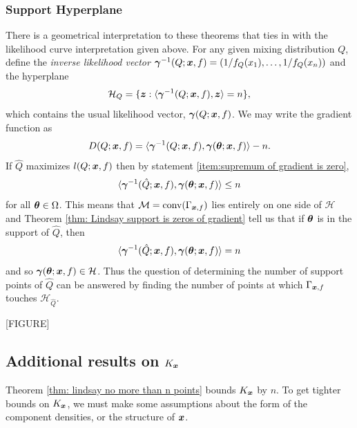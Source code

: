 	\subsubsection{Support Hyperplane}
	\label{sec: support hyperplane}
	There is a geometrical interpretation to these theorems that ties in with the likelihood curve interpretation given above. For any given mixing distribution $Q$, define the \emph{inverse likelihood vector} ${\bm{{\gamma}}}^{-1}(Q;{\bm{{x}}},f) = (1/f_Q(x_1),\dots, 1/f_Q(x_n))$ and the hyperplane
	\begin{equation}
		\mathcal{H}_{Q} = \{{\bm{{z}}} : \langle {\bm{{\gamma}}}^{-1}(Q;{\bm{{x}}},f), {\bm{{z}}}\rangle = n\},
	\end{equation}
	which contains the usual likelihood vector, ${\bm{{\gamma}}}(Q;{\bm{{x}}}, f)$. We may write the gradient function as
	\begin{equation}
		D(Q;{\bm{{x}}},f) = \langle {\bm{{\gamma}}}^{-1}(Q;{\bm{{x}}},f), {\bm{{\gamma}}}({\bm{{\theta}}};{\bm{{x}}},f)\rangle - n.
	\end{equation}
	If $\hat{Q}$ maximizes $l(Q;{\bm{{x}}},f)$ then by statement \ref{item:supremum of gradient is zero}, 
	\begin{equation}
		\langle {\bm{{\gamma}}}^{-1}(\hat{Q};{\bm{{x}}},f), {\bm{{\gamma}}}({\bm{{\theta}}};{\bm{{x}}},f) \rangle \leq n
	\end{equation}
	for all ${\bm{{\theta}}} \in \Omega$. This means that $\mathcal{M} = \mathrm{conv}(\Gamma_{{\bm{{x}}},f})$ lies entirely on one side of $\mathcal{H}$ and Theorem \ref{thm: Lindsay support is zeros of gradient} tell us that if ${\bm{{\theta}}}$ is in the support of $\hat{Q}$, then 
	\begin{equation}
		\langle {\bm{{\gamma}}}^{-1}(\hat{Q};{\bm{{x}}},f), {\bm{{\gamma}}}({\bm{{\theta}}};{\bm{{x}}},f) \rangle = n
	\end{equation}
	and so ${\bm{{\gamma}}}({\bm{{\theta}}};{\bm{{x}}},f) \in \mathcal{H}$. Thus the question of determining the number of support points of $\hat{Q}$ can be answered by finding the number of points at which $\Gamma_{{\bm{{x}}},f}$ touches $\mathcal{H}_{\hat{Q}}$.

	[FIGURE]

	\subsection{Additional results on \texorpdfstring{$K_{\bm{{x}}}$}{Kx}}

	Theorem \ref{thm: lindsay no more than n points} bounds $K_{\bm{{x}}}$ by $n$. To get tighter bounds on $K_{\bm{{x}}}$, we must make some assumptions about the form of the component densities, or the structure of ${\bm{{x}}}$.

